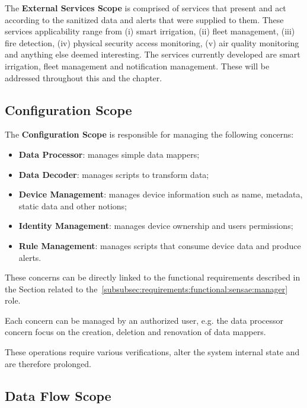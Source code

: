 The \textbf{External Services Scope} is comprised of services that present and act according to the sanitized data and alerts that were supplied to them. These services applicability range from (i) smart irrigation, (ii) fleet management, (iii) fire detection, (iv) physical security access monitoring, (v) air quality monitoring and anything else deemed interesting. The services currently developed are smart irrigation, fleet management and notification management. These will be addressed throughout this and the  chapter.

\subsection{Configuration Scope}
\label{subsec:design:system_scopes:configuration_scope}

The \textbf{Configuration Scope} is responsible for managing the following concerns:

\begin{itemize}
   \item \textbf{Data Processor}: manages simple data mappers;
   \item \textbf{Data Decoder}: manages scripts to transform data;
   \item \textbf{Device Management}: manages device information such as name, metadata, static data and other notions;
   \item \textbf{Identity Management}: manages device ownership and users permissions;
   \item \textbf{Rule Management}: manages scripts that consume device data and produce alerts.
\end{itemize}

These concerns can be directly linked to the functional requirements described in the Section related to the~\ref{subsubsec:requirements:functional:sensae:manager} role.

Each concern can be managed by an authorized user, e.g. the data processor concern focus on the creation, deletion and renovation of data mappers.

These operations require various verifications, alter the system internal state and are therefore prolonged.

\subsection{Data Flow Scope}
\label{subsec:design:system_scopes:data_flow_scope}

